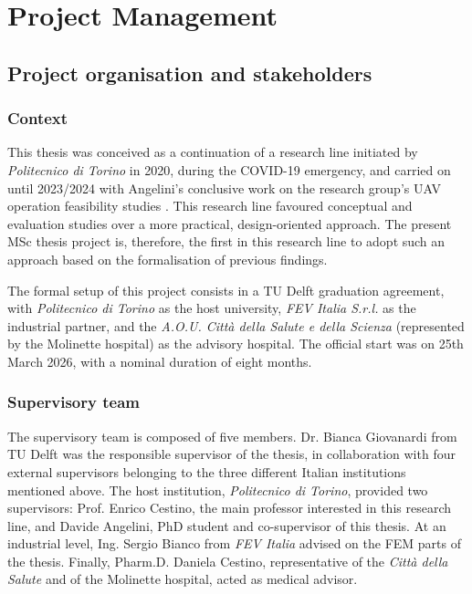 \chapter{Project Management}
\label{chapter:projectManagement}

\section{Project organisation and stakeholders}
\label{sec:pm-organisation}
 
\subsection{Context}
This thesis was conceived as a continuation of a research line initiated by \textit{Politecnico di Torino} in 2020, during the COVID-19 emergency, and carried on until 2023/2024 with Angelini's conclusive work on the research group's UAV operation feasibility studies \cite{Angelini2023}. This research line favoured conceptual and evaluation studies over a more practical, design-oriented approach. The present MSc thesis project is, therefore, the first in this research line to adopt such an approach based on the formalisation of previous findings.

The formal setup of this project consists in a TU Delft graduation agreement, with \textit{Politecnico di Torino} as the host university, \textit{FEV Italia S.r.l.} as the industrial partner, and the \textit{A.O.U. Città della Salute e della Scienza} (represented by the Molinette hospital) as the advisory hospital. The official start was on 25th March 2026, with a nominal duration of eight months.
 
\subsection{Supervisory team}
The supervisory team is composed of five members. Dr. Bianca Giovanardi from TU Delft was the responsible supervisor of the thesis, in collaboration with four external supervisors belonging to the three different Italian institutions mentioned above. The host institution, \textit{Politecnico di Torino}, provided two supervisors: Prof. Enrico Cestino, the main professor interested in this research line, and Davide Angelini, PhD student and co-supervisor of this thesis. At an industrial level, Ing. Sergio Bianco from \textit{FEV Italia} advised on the FEM parts of the thesis. Finally, Pharm.D. Daniela Cestino, representative of the \textit{Città della Salute} and of the Molinette hospital, acted as medical advisor.

